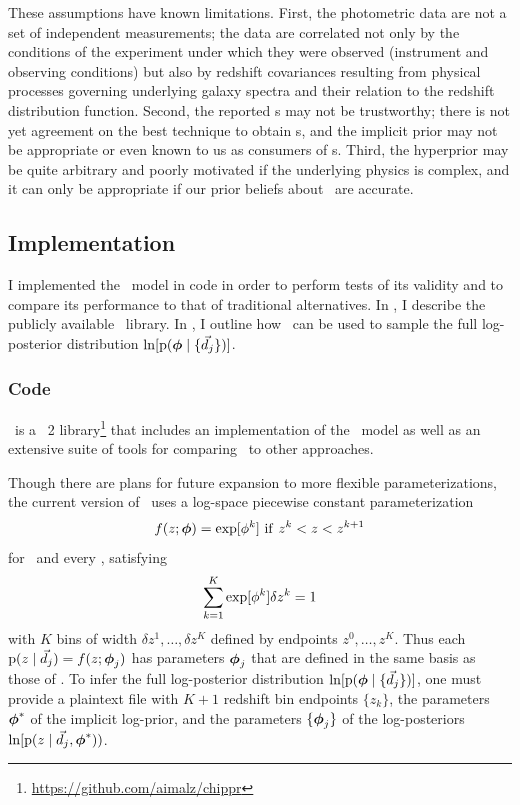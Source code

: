 These assumptions have known limitations.  
First, the photometric data are not a set of independent measurements; the data are correlated not only by the conditions of the experiment under which they were observed (instrument and observing conditions) but also by redshift covariances resulting from physical processes governing underlying galaxy spectra and their relation to the redshift distribution function.
Second, the reported \pzip s may not be trustworthy; there is not yet agreement on the best technique to obtain \pzpdf s, and the implicit prior may not be appropriate or even known to us as consumers of \pzip s.  
Third, the hyperprior may be quite arbitrary and poorly motivated if the underlying physics is complex, and it can only be appropriate if our prior beliefs about \nz\ are accurate.

\subsection{Implementation}

I implemented the \Chippr\ model in code in order to perform tests of its validity and to compare its performance to that of traditional alternatives.
In , I describe the publicly available \chippr\ library.
In , I outline how \chippr\ can be used to sample the full log-posterior distribution $\ln[\mathrm{p}({\boldsymbol{\phi}} \mid \{\vec{d}_{j}\})]$.

\subsubsection{Code}

\chippr\ is a \python\ 2 library\footnote{\url{https://github.com/aimalz/chippr}} that includes an implementation of the \Chippr\ model as well as an extensive suite of tools for comparing \Chippr\ to other approaches.

Though there are plans for future expansion to more flexible parameterizations, the current version of \chippr\ uses a log-space piecewise constant parameterization
\begin{equation}
\eqlabel{eqn:logstepfunc}
f(z; \ndphi) = \exp[\phi^{k}]\ \mathrm{if}\ z^{k} < z < z^{k+1}
\end{equation}
for \nz\ and every \pzpdf, satisfying
\begin{equation}
\eqlabel{eqn:logstepfuncnorm}
\sum_{k=1}^{K} \exp[\phi^{k}] \delta z^{k} = 1
\end{equation}
with $K$ bins of width $\delta z^{1}, \dots, \delta z^{K}$ defined by endpoints $z^{0}, \dots, z^{K}$.
Thus each $\mathrm{p}(z \mid \vec{d}_{j}) = f(z; {\boldsymbol{\phi}}_{j})$ has parameters ${\boldsymbol{\phi}}_{j}$ that are defined in the same basis as those of \nz.
To infer the full log-posterior distribution $\ln[\mathrm{p}({\boldsymbol{\phi}} \mid \{\vec{d}_{j}\})]$, one must provide a plaintext file with $K+1$ redshift bin endpoints $\{z_{k}\}$, the parameters ${\boldsymbol{\phi}}^{*}$ of the implicit log-prior, and the parameters $\{{\boldsymbol{\phi}}_{j}\}$ of the log-posteriors $\ln[\mathrm{p}(z \mid \vec{d}_{j}, {\boldsymbol{\phi}}^{*}))$.

